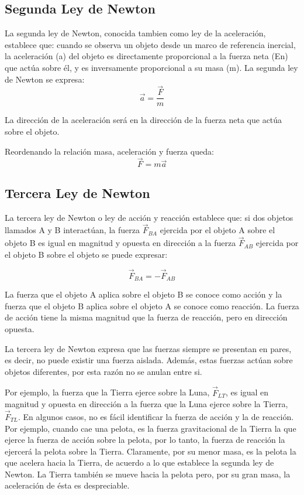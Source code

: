 \documentclass[11pt]{book}
\begin{document}
\subsection{Segunda Ley de Newton}
La segunda ley de Newton, conocida tambien como ley de la aceleración, establece que:
cuando se observa un objeto desde un marco de referencia inercial, la aceleración (a)
del objeto es directamente proporcional a la fuerza neta (En) que actúa sobre él,
y es inversamente proporcional a su masa (m).
La segunda ley de Newton se expresa:
\begin{equation}
    \vec{a}=\frac{\vec{F}}{m}
\end{equation}

La dirección de la aceleración será en la dirección de la fuerza neta que actúa sobre el objeto.

Reordenando la relación masa, aceleración y fuerza queda:
\begin{equation}
    \vec{F}=m\vec{a}
\end{equation}

\subsection{Tercera Ley de Newton}
La tercera ley de Newton o ley de acción y reacción establece que: si dos objetos llamados A y B
interactúan, la fuerza $\vec{F}_{BA}$ ejercida por el objeto A sobre el objeto B es igual en
magnitud y opuesta en dirección a la fuerza $\vec{F}_{AB}$ ejercida por el objeto B sobre el
objeto se puede
expresar:

\begin{equation}
    \vec{F}_{BA}=-\vec{F}_{AB}
\end{equation}


La fuerza que el objeto A aplica sobre el objeto B se conoce como
acción y la fuerza que el objeto B aplica sobre el objeto A se conoce
como reacción. La fuerza de acción tiene la misma magnitud que la
fuerza de reacción, pero en dirección opuesta.

La tercera ley de Newton expresa que las fuerzas siempre se presentan
en pares, es decir, no puede existir una fuerza aislada. Además, estas fuerzas actúan
sobre objetos diferentes, por esta razón no se anulan entre si.

Por ejemplo, la fuerza que la Tierra ejerce sobre la Luna, $\vec{F}_{LT}$, es igual
en magnitud y opuesta en dirección a la fuerza que la Luna ejerce sobre la Tierra, $\vec{F}_{TL}$.
En algunos casos, no es fácil identificar la fuerza de acción y la de reacción.
Por ejemplo, cuando cae una pelota, es la fuerza gravitacional de la Tierra la que ejerce la fuerza
de acción sobre la pelota, por lo tanto, la fuerza de reacción la ejercerá la pelota sobre la Tierra.
Claramente, por su menor masa, es la pelota la que acelera hacia la Tierra, de acuerdo a lo que
establece la segunda ley de Newton. La Tierra también se mueve hacia la pelota pero, por su gran masa,
la aceleración de ésta es despreciable.
\newpage \thispagestyle{plain}
\end{document}
